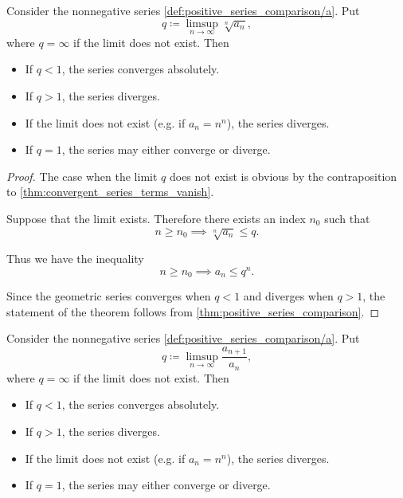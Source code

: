\begin{proposition}\label{thm:cauchys_root_test}\cite[theorem 3.33]{Rudin1991}
  Consider the nonnegative series \cref{def:positive_series_comparison/a}. Put
  \begin{equation*}
    q \coloneqq \limsup_{n \to \infty} \sqrt[n]{a_n},
  \end{equation*}
  where \( q = \infty \) if the limit does not exist. Then
  \begin{itemize}
    \item If \( q < 1 \), the series converges absolutely.
    \item If \( q > 1 \), the series diverges.
    \item If the limit does not exist (e.g. if \( a_n = n^n \)), the series diverges.
    \item If \( q = 1 \), the series may either converge or diverge.
  \end{itemize}
\end{proposition}
\begin{proof}
  The case when the limit \( q \) does not exist is obvious by the contraposition to \cref{thm:convergent_series_terms_vanish}.

  Suppose that the limit exists. Therefore there exists an index \( n_0 \) such that
  \begin{equation*}
    n \geq n_0 \implies \sqrt[n]{a_n} \leq q.
  \end{equation*}

  Thus we have the inequality
  \begin{equation*}
    n \geq n_0 \implies a_n \leq q^n.
  \end{equation*}

  Since the geometric series converges when \( q < 1 \) and diverges when \( q > 1 \), the statement of the theorem follows from \cref{thm:positive_series_comparison}.
\end{proof}

\begin{proposition}\label{thm:dalamberts_ratio_test}\cite[theorem 3.33]{Rudin1991}
  Consider the nonnegative series \cref{def:positive_series_comparison/a}. Put
  \begin{equation*}
    q \coloneqq \limsup_{n \to \infty} \frac {a_{n+1}} {a_n},
  \end{equation*}
  where \( q = \infty \) if the limit does not exist. Then
  \begin{itemize}
    \item If \( q < 1 \), the series converges absolutely.
    \item If \( q > 1 \), the series diverges.
    \item If the limit does not exist (e.g. if \( a_n = n^n \)), the series diverges.
    \item If \( q = 1 \), the series may either converge or diverge.
  \end{itemize}
\end{proposition}
